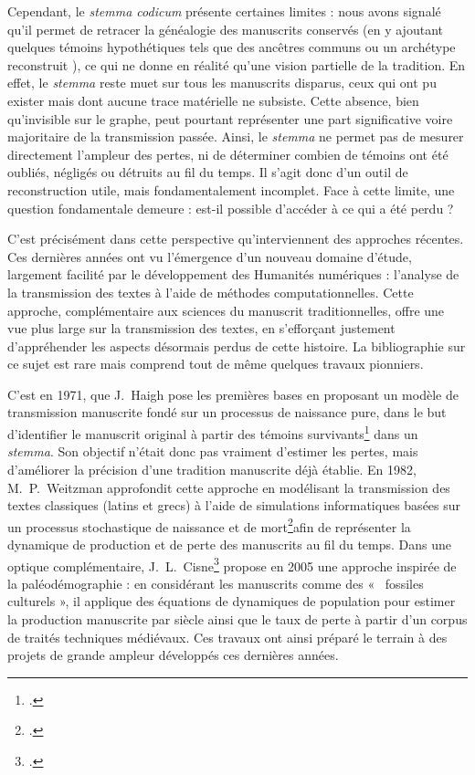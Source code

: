 \documentclass[a4paper,twoside,12pt]{book}
\begin{document}
Cependant, le \textit{stemma codicum} présente certaines limites : nous avons signalé qu'il permet de retracer la généalogie des manuscrits conservés (en y ajoutant quelques témoins hypothétiques tels que des ancêtres communs ou un archétype reconstruit ), ce qui  ne donne en réalité qu’une vision partielle de la tradition. En effet, le \textit{stemma} reste muet sur tous les manuscrits disparus, ceux qui ont pu exister mais dont aucune trace matérielle ne subsiste. Cette absence, bien qu’invisible sur le graphe, peut pourtant représenter une part significative voire majoritaire de la transmission passée. Ainsi, le \textit{stemma} ne permet pas de mesurer directement l’ampleur des pertes, ni de déterminer combien de témoins ont été oubliés, négligés ou détruits au fil du temps. Il s’agit donc d’un outil de reconstruction utile, mais fondamentalement incomplet. Face à cette limite, une question fondamentale demeure : est-il possible d'accéder à ce qui a été perdu ?

 C’est précisément dans cette perspective qu’interviennent des approches récentes. Ces dernières années ont vu l'émergence d'un nouveau domaine d'étude, largement facilité par le développement des Humanités numériques : l'analyse de la transmission des textes à l'aide de méthodes computationnelles. Cette approche, complémentaire aux sciences du manuscrit traditionnelles, offre une vue plus large sur la transmission des textes, en s'efforçant justement d’appréhender les aspects désormais perdus de cette histoire. La bibliographie sur ce sujet est rare mais comprend tout de même quelques travaux pionniers.

C'est en 1971, que J.~Haigh pose les premières bases en proposant un modèle de transmission manuscrite fondé sur un processus de naissance pure, dans le but d’identifier le manuscrit original à partir des témoins survivants\footcite{haigh} dans un \textit{stemma}. Son objectif n’était donc pas vraiment d’estimer les pertes, mais d’améliorer la précision d'une tradition manuscrite déjà établie. En 1982, M.~P.~Weitzman approfondit cette approche en modélisant la transmission des textes classiques (latins et grecs) à l’aide de simulations informatiques basées sur un processus stochastique de naissance et de mort\footcite{weitzman1987evolution}afin de représenter la dynamique de production et de perte des manuscrits au fil du temps. Dans une optique complémentaire, J.~L.~Cisne\footcite{cisne} propose en 2005 une approche inspirée de la paléodémographie : en considérant les manuscrits comme des «~ fossiles culturels », il applique des équations de dynamiques de population pour estimer la production manuscrite par siècle ainsi que le taux de perte à partir d’un corpus de traités techniques médiévaux. Ces travaux ont ainsi préparé le terrain à des projets de grande ampleur développés ces dernières années. 
\end{document}
